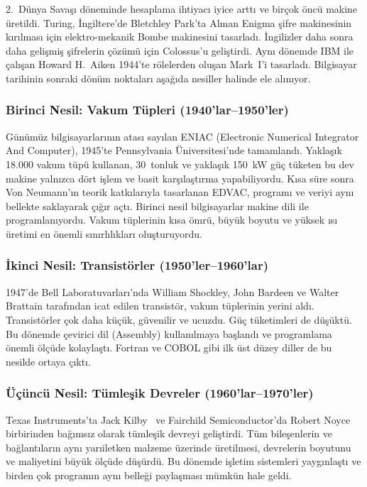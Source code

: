 2.~Dünya Savaşı döneminde hesaplama ihtiyacı iyice arttı ve birçok öncü makine üretildi. Turing, İngiltere'de Bletchley Park'ta Alman Enigma şifre makinesinin kırılması için elektro-mekanik Bombe makinesini tasarladı. İngilizler daha sonra daha gelişmiş şifrelerin çözümü için Colossus'u geliştirdi. Aynı dönemde IBM ile çalışan Howard H.~Aiken 1944'te rölelerden oluşan Mark~I'i tasarladı. Bilgisayar tarihinin sonraki dönüm noktaları aşağıda nesiller halinde ele alınıyor.

\subsubsection*{Birinci Nesil: Vakum Tüpleri (1940'lar--1950'ler)}
Günümüz bilgisayarlarının atası sayılan ENIAC (Electronic Numerical Integrator And Computer), 1945'te Pennsylvania Üniversitesi'nde tamamlandı. Yaklaşık 18.000 vakum tüpü kullanan, 30~tonluk ve yaklaşık 150~kW güç tüketen bu dev makine yalnızca dört işlem ve basit karşılaştırma yapabiliyordu. Kısa süre sonra Von Neumann'ın teorik katkılarıyla tasarlanan EDVAC, programı ve veriyi aynı bellekte saklayarak çığır açtı. Birinci nesil bilgisayarlar makine dili ile programlanıyordu. Vakum tüplerinin kısa ömrü, büyük boyutu ve yüksek ısı üretimi en önemli sınırlılıkları oluşturuyordu.

\subsubsection*{İkinci Nesil: Transistörler (1950'ler--1960'lar)}
1947'de Bell Laboratuvarları'nda William Shockley, John Bardeen ve Walter Brattain tarafından icat edilen transistör, vakum tüplerinin yerini aldı. Transistörler çok daha küçük, güvenilir ve ucuzdu. Güç tüketimleri de düşüktü. Bu dönemde çevirici dil (Assembly) kullanılmaya başlandı ve programlama önemli ölçüde kolaylaştı. Fortran ve COBOL gibi ilk üst düzey diller de bu nesilde ortaya çıktı.

\subsubsection*{Üçüncü Nesil: Tümleşik Devreler (1960'lar--1970'ler)}
Texas Instruments'ta Jack Kilby~\cite{kilby1964} ve Fairchild Semiconductor'da Robert Noyce birbirinden bağımsız olarak tümleşik devreyi geliştirdi. Tüm bileşenlerin ve bağlantıların aynı yarıiletken malzeme üzerinde üretilmesi, devrelerin boyutunu ve maliyetini büyük ölçüde düşürdü. Bu dönemde işletim sistemleri yaygınlaştı ve birden çok programın aynı belleği paylaşması mümkün hale geldi.

